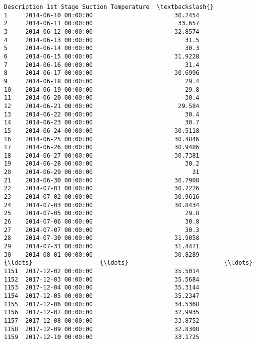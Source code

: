 \documentclass[11pt]{article}
\makeatletter
\newcommand{\boxspacing}{\kern\kvtcb@left@rule\kern\kvtcb@boxsep}
\newcommand{\prompt}[4]{
        \ttfamily\llap{{\color{#2}[#3]:\hspace{3pt}#4}}\vspace{-\baselineskip}
    }
\makeatother
\begin{document}
            \begin{tcolorbox}[breakable, size=fbox, boxrule=.5pt, pad at break*=1mm, opacityfill=0]
\prompt{Out}{outcolor}{10}{\boxspacing}
\begin{Verbatim}[commandchars=\\\{\}]
              Description 1st Stage Suction Temperature  \textbackslash{}
1     2014-06-10 00:00:00                       30.2454
2     2014-06-11 00:00:00                        33.657
3     2014-06-12 00:00:00                       32.8574
4     2014-06-13 00:00:00                          31.5
5     2014-06-14 00:00:00                          30.3
6     2014-06-15 00:00:00                       31.9228
7     2014-06-16 00:00:00                          31.4
8     2014-06-17 00:00:00                       30.6996
9     2014-06-18 00:00:00                          29.4
10    2014-06-19 00:00:00                          29.8
11    2014-06-20 00:00:00                          30.4
12    2014-06-21 00:00:00                        29.584
13    2014-06-22 00:00:00                          30.4
14    2014-06-23 00:00:00                          30.7
15    2014-06-24 00:00:00                       30.5118
16    2014-06-25 00:00:00                       30.4846
17    2014-06-26 00:00:00                       30.9486
18    2014-06-27 00:00:00                       30.7381
19    2014-06-28 00:00:00                          30.2
20    2014-06-29 00:00:00                            31
21    2014-06-30 00:00:00                       30.7908
22    2014-07-01 00:00:00                       30.7226
23    2014-07-02 00:00:00                       30.9616
24    2014-07-03 00:00:00                       30.8434
25    2014-07-05 00:00:00                          29.8
26    2014-07-06 00:00:00                          30.8
27    2014-07-07 00:00:00                          30.3
28    2014-07-30 00:00:00                       31.9058
29    2014-07-31 00:00:00                       31.4471
30    2014-08-01 00:00:00                       30.8289
{\ldots}                   {\ldots}                           {\ldots}
1151  2017-12-02 00:00:00                       35.5014
1152  2017-12-03 00:00:00                       35.5684
1153  2017-12-04 00:00:00                       35.3144
1154  2017-12-05 00:00:00                       35.2347
1155  2017-12-06 00:00:00                       34.5368
1156  2017-12-07 00:00:00                       32.9935
1157  2017-12-08 00:00:00                       33.8752
1158  2017-12-09 00:00:00                       32.8308
1159  2017-12-10 00:00:00                       33.1725

\end{Verbatim}
\end{tcolorbox}
\end{document}
